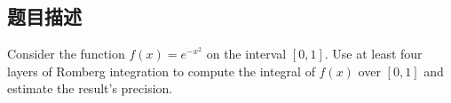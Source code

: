 \subsection{题目描述}
\noindent Consider the function \( f(x) = e^{-x^2} \) on the interval \([0,1]\). Use at least four layers of Romberg integration to compute the integral of \( f(x) \) over \([0,1]\) and estimate the result's precision.
